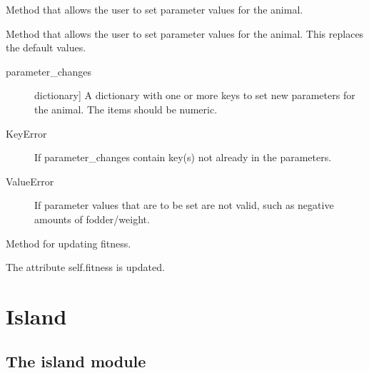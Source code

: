 \documentclass[a4paper,10pt,english]{sphinxmanual}
\begin{document}
\begin{fulllineitems}

\begin{fulllineitems}
\label{\detokenize{animals:biosim.animals.Herbivore.set_parameters}}
Method that allows the user to set parameter values for the animal.

Method that allows the user to set parameter values for the animal.
This replaces the default values.
\begin{description}
\item[{parameter\_changes}] \leavevmode{[}dictionary{]}
A dictionary with one or more keys to set new parameters for the
animal. The items should be numeric.

\end{description}
\begin{description}
\item[{KeyError}] \leavevmode
If parameter\_changes contain key(s) not already in the parameters.

\item[{ValueError}] \leavevmode
If parameter values that are to be set are not valid, such as
negative amounts of fodder/weight.

\end{description}

\end{fulllineitems}


\begin{fulllineitems}
\label{\detokenize{animals:biosim.animals.Herbivore.update_fitness}}
Method for updating fitness.

The attribute self.fitness is updated.

\end{fulllineitems}


\end{fulllineitems}



\chapter{Island}
\label{\detokenize{island:island}}\label{\detokenize{island::doc}}

\section{The island module}
\label{\detokenize{island:the-island-module}}\label{\detokenize{island:module-biosim.island}}
\end{document}
